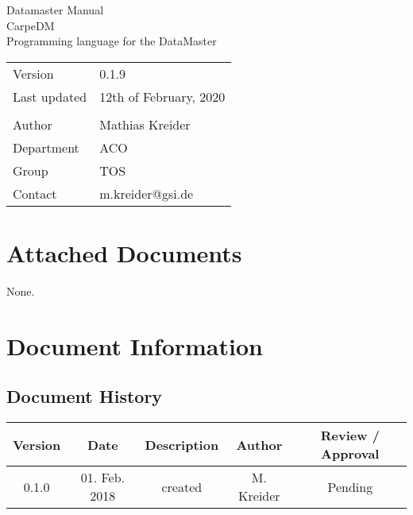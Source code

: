 \documentclass[12pt,a4paper]{report}
\makeatletter
\newcommand{\AppendixA}{dm_memmap}
\newcommand{\AppendixB}{dm_language}
\newcommand{\DocAuthor}{Mathias Kreider}
\newcommand{\DocContact}{m.kreider@gsi.de}
\newcommand{\DocTitle}{CarpeDM\\Programming language for the DataMaster}
\newcommand{\DocName}{Datamaster Manual}
\newcommand{\DocRev}{12th of February, 2020} %
\newcommand{\DocVer}{0.1.9}
\newcommand{\DocGroup}{TOS}
\newcommand{\DocDept}{ACO}
\newcommand{\DocHist}{
0.1.0 & 01. Feb. 2018 & created & M. Kreider & Pending\\
\hline
}
\makeatother
\begin{document}
\begin{titlepage}
\begin{center}
\vspace{2em} 

\Huge{\DocName}\\[2cm]
\Large{\DocTitle}\\[2cm] 

\begin{large}
\begin{tabularx}{\textwidth}{Xl}
Version & \DocVer\\
Last updated & \DocRev\\
\vspace{1.5cm}\\
Author & \DocAuthor\\
Department & \DocDept\\
Group & \DocGroup\\
Contact & \DocContact
\end{tabularx}%
\end{large}

\vfill

\end{center}
\end{titlepage}



%
%
%
\pagestyle{plain} %
\tableofcontents

\glsunsetall
\setcounter{chapter}{0}











\appendix
\renewcommand{\thechapter}{\Roman{chapter}}
\chapter{Attached Documents}
None.
\begingroup
\raggedright
\sloppy
\printbibliography[heading=bibnumbered]
\endgroup
\chapter{Document Information}
\section{Document History}
\begin{table}[H]
\begin{tabular}{ | c | c | c | c | c |}
\hline
\textbf{Version} & \textbf{Date} & \textbf{Description} & \textbf{Author} & \textbf{Review / Approval} \\
\hline
\DocHist
\hline
\end{tabular}
\end{table}
\end{document}
